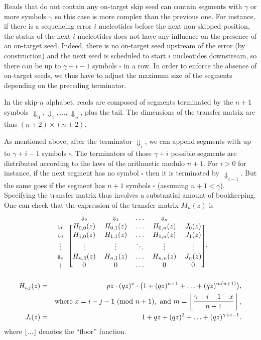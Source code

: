 \documentclass{article}
\newcommand{\Dn}[1]{\scriptstyle{\Downarrow_{#1}}}
\newcommand{\nd}{\scriptstyle{|}}
\newcommand{\modulo}[1]{\ (\mathrm{mod}\ #1)}
\begin{document}
Reads that do not contain any on-target skip seed can contain segments
with $\gamma$ or more symbols $\square$, so this case is more complex than
the previous one. For instance, if there is a sequencing error $i$
nucleotides before the next non-skipped position, the status of the next
$i$ nucleotides does not have any influence on the presence of an
on-target seed. Indeed, there is no on-target seed upstream of the error
(by construction) and the next seed is scheduled to start $i$ nucleotides
downstream, so there can be up to $\gamma+i-1$ symbols $\square$ in a row.
In order to enforce the absence of on-target seeds, we thus have to adjust
the maximum size of the segments depending on the preceding terminator.

In the skip-$n$ alphabet, reads are composed of segments terminated by the
$n+1$ symbols $\Downarrow_0, \Downarrow_1, \ldots, \Downarrow_n$, plus the
tail. The dimensions of the transfer matrix are thus $(n+2) \times (n+2)$.

As mentioned above, after the terminator $\Downarrow_i$, we can append
segments with up to $\gamma+i-1$ symbols $\square$. The terminators of
those $\gamma+i$ possible segments are distributed according to the laws
of the arithmetic modulo $n+1$. For $i > 0$ for instance, if the next
segment has no symbol $\square$ then it is terminated by
$\Downarrow_{i-1}$. But the same goes if the segment has $n+1$ symbols
$\square$ (assuming $n+1 < \gamma$). Specifying the transfer matrix thus
involves a substantial amount of bookkeeping. One can check that the
expression of the transfer matrix $M_n(z)$ is
\begin{equation*}
\begin{blockarray}{cccccc}
   & \Dn{0} & \Dn{1} & \ldots & \Dn{n} & \nd \\
\begin{block}{c[ccccc]}
\Dn{0} & H_{0,0}(z) & H_{0,1}(z) & \ldots & H_{0,n}(z) & J_0(z) \\
\Dn{1} & H_{1,0}(z) & H_{1,1}(z) & \ldots & H_{1,n}(z) & J_1(z) \\
\vdots & \vdots & \vdots & \ddots & \vdots & \vdots \\
\Dn{n} & H_{n,0}(z) & H_{n,1}(z) & \ldots & H_{n,n}(z) & J_n(z) \\
\nd & 0 & 0 & \ldots & 0 & 0 \\
\end{block}
\end{blockarray},
\end{equation*}
\begin{eqnarray}
H_{i,j}(z) &=& pz \cdot (qz)^x \cdot \big( 1 + (qz)^{n+1} +
  \ldots + (qz)^{m(n+1)} \big), \\
\notag
  &\;& \text{where } x = i-j-1 \modulo{n+1},
  \text{ and } m = \left\lfloor
  \frac{\gamma+i-1-x}{n+1} \right\rfloor, \\
J_i(z) &=& 1 + qz + (qz)^2 + \ldots + (qz)^{\gamma+i-1}.
\end{eqnarray}
where $\lfloor \ldots \rfloor$ denotes the ``floor'' function.
\end{document}
